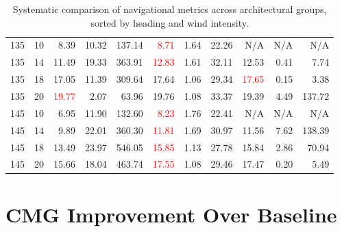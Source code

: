 \begin{table}[H]
\begin{tabular}{@{}rr rrr rrr rrr@{}}
\midrule
135 & 10 &  8.39 & 10.32 & 137.14 & \textcolor{red}{8.71} & 1.64 & 22.26 & N/A   & N/A   & N/A    \\
135 & 14 & 11.49 & 19.33 & 363.91 & \textcolor{red}{12.83} & 1.61 & 32.11 & 12.53 &  0.41 &   7.74 \\
135 & 18 & 17.05 & 11.39 & 309.64 & 17.64 & 1.06 & 29.34 & \textcolor{red}{17.65} &  0.15 &   3.38 \\
135 & 20 & \textcolor{red}{19.77} &  2.07 &  63.96 & 19.76 & 1.08 & 33.37 & 19.39 &  4.49 & 137.72 \\
\midrule
145 & 10 &  6.95 & 11.90 & 132.60 & \textcolor{red}{8.23} & 1.76 & 22.41 & N/A   & N/A   & N/A    \\
145 & 14 &  9.89 & 22.01 & 360.30 & \textcolor{red}{11.81} & 1.69 & 30.97 & 11.56 &  7.62 & 138.39 \\
145 & 18 & 13.49 & 23.97 & 546.05 & \textcolor{red}{15.85} & 1.13 & 27.78 & 15.84 &  2.86 &  70.94 \\
145 & 20 & 15.66 & 18.04 & 463.74 & \textcolor{red}{17.55} & 1.08 & 29.46 & 17.47 &  0.20 &   5.49 \\
\bottomrule
\end{tabular}
\caption{Systematic comparison of navigational metrics across architectural groups, sorted by heading and wind intensity.}
\label{tab:results_sorted}
\end{table}

\section{CMG Improvement Over Baseline}
\label{sec:cmg_improvement}

